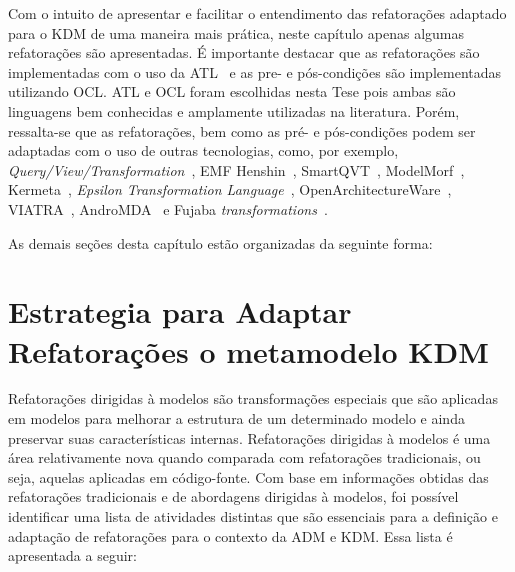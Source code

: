 Com o intuito de apresentar e facilitar o entendimento das refatorações adaptado para o KDM de uma maneira mais prática, neste capítulo apenas algumas refatorações são apresentadas. É importante destacar que as refatorações são implementadas com o uso da ATL~\cite{Allilaire_06, Jouault_2005, Jouault_2008} e as pre- e pós-condições são implementadas utilizando OCL. ATL e OCL foram escolhidas nesta Tese pois ambas são linguagens bem conhecidas e amplamente utilizadas na literatura. Porém, ressalta-se que as refatorações, bem como as pré- e pós-condições podem ser adaptadas com o uso de outras tecnologias, como, por exemplo, \textit{Query/View/Transformation}~\cite{QVT:OMG}, EMF Henshin~\cite{EMF_Henshin}, SmartQVT~\cite{SmartQVT}, ModelMorf~\cite{ModelMorf}, Kermeta~\cite{kermeta}, \textit{Epsilon Transformation Language}~\cite{ETL_eclipse}, OpenArchitectureWare~\cite{OpenArchitectureWare}, VIATRA~\cite{viatra}, AndroMDA~\cite{andromda} e Fujaba \textit{transformations}~\cite{fujaba}.

As demais seções desta capítulo estão organizadas da seguinte forma:

\section{Estrategia para Adaptar Refatorações o metamodelo KDM}

Refatorações dirigidas à modelos são transformações especiais que são aplicadas em modelos para melhorar a estrutura de um determinado modelo e ainda preservar suas características internas. Refatorações dirigidas à modelos é uma área relativamente nova quando comparada com refatorações tradicionais, ou seja, aquelas aplicadas em código-fonte. Com base em informações obtidas das refatorações tradicionais e de abordagens dirigidas à modelos, foi possível identificar uma lista de atividades distintas que são essenciais para a definição e adaptação de refatorações para o contexto da ADM e KDM. Essa lista é apresentada a seguir:

